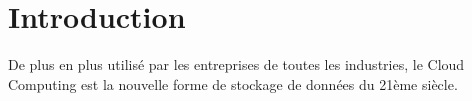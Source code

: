 \section*{Introduction}
De plus en plus utilisé par les entreprises de toutes les industries, le Cloud Computing est la nouvelle forme de stockage de données du 21ème siècle.